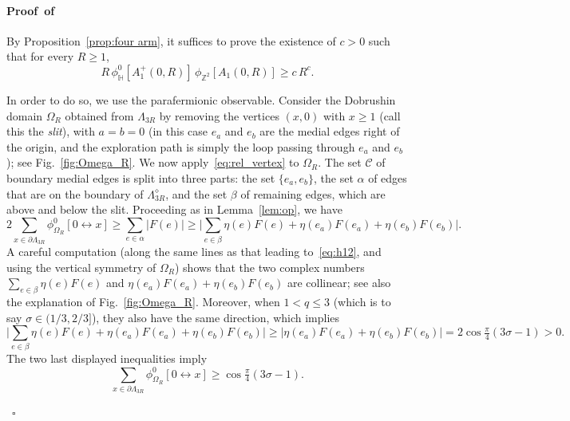 \documentclass[a4paper,oneside,11pt]{article}
\numberwithin{equation}{section}
\numberwithin{equation}{section}
\numberwithin{equation}{section}
\newenvironment{proof}[1][\relax]%
  {\paragraph{Proof\ifx#1\relax\else~of #1\fi}}%
  {~\hfill$\square$\par\bigskip}
\newcommand{\calC}{\mathcal{C}}
\newcommand{\bbH}{\mathbb{H}}
\newcommand{\bbZ}{\mathbb{Z}}
\begin{document}
\begin{proof}
By Proposition~\ref{prop:four arm}, it suffices to prove the existence of $c>0$ such that for every $R\ge1$,
\begin{equation}\label{eq:h21}
	R\, \phi_{\bbH}^0[A^+_1(0,R)]\, \phi_{\bbZ^2}[A_1(0,R)]\ge c\,R^c.
\end{equation}

In order to do so, we use the parafermionic observable. 
Consider the Dobrushin domain $\Omega_R$ obtained from $\Lambda_{3R}$ by removing the vertices $(x,0)$ with $x\ge1$ (call this the {\em slit}), 
with $a=b=0$ (in this case $e_a$ and $e_b$ are the medial edges right of the origin, 
and the exploration path is simply the loop passing through $e_a$ and $e_b$); see Fig.~\ref{fig:Omega_R}. 
We now apply~\eqref{eq:rel_vertex} to $\Omega_R$.
The set $\calC$ of boundary medial edges is split into three parts: 
the set $\{e_a,e_b\}$, the set $\alpha$ of edges that are on the boundary of $\Lambda_{3R}^\diamond$, and the set $\beta$ of remaining edges, which are above and below the slit. Proceeding as in Lemma~\ref{lem:op}, we have
\begin{equation}\label{eq:5.15}
	2\sum_{x\in \partial\Lambda_{3R}}\phi_{\Omega_R}^0[0\longleftrightarrow x]
	\ge\sum_{e\in\alpha}|F(e)|\ge \big|\sum_{e\in\beta}\eta(e)F(e)+\eta(e_a)F(e_a)+\eta(e_b)F(e_b)\big|.
\end{equation}
A careful computation (along the same lines as that leading to~\eqref{eq:h12}, and using the vertical symmetry of $\Omega_R$)
shows that the two complex numbers $\sum_{e\in\beta}\eta(e)F(e)$ and $\eta(e_a)F(e_a)+\eta(e_b)F(e_b)$ are collinear; see also the explanation of Fig.~\ref{fig:Omega_R}. 
Moreover, when $1 < q\leq 3$ (which is to say $\sigma \in (1/3,2/3]$), they also have the same direction, 
which implies 
\begin{equation*}
	\big|\sum_{e\in\beta}\eta(e)F(e)+\eta(e_a)F(e_a)+\eta(e_b)F(e_b)\big|
	\ge |\eta(e_a)F(e_a)+\eta(e_b)F(e_b)|= 2\cos \tfrac{\pi}4(3\sigma-1)  >0.
\end{equation*}
The two last displayed inequalities imply
\begin{equation}\label{eq:5.17}
	\sum_{x\in\partial\Lambda_{3R}}\phi_{\Omega_R}^0[0\longleftrightarrow x]\ge \cos \tfrac{\pi}4(3\sigma-1).
\end{equation}


\end{proof}
\end{document}

